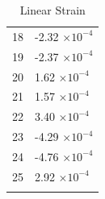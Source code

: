 \documentclass[a4paper,11pt]{article}
\begin{document}
\begin{center}
\begin{longtable}{|R{1.5cm}|R{2.5cm}|}
   18 &        -2.32 $\times 10^{          -4}$ \\
   19 &        -2.37 $\times 10^{          -4}$ \\
   20 &         1.62 $\times 10^{          -4}$ \\
   21 &         1.57 $\times 10^{          -4}$ \\
 {\color{OliveGreen}  22} & {\color{OliveGreen}        3.40 $\times 10^{          -4}$} \\
   23 &        -4.29 $\times 10^{          -4}$ \\
 {\color{red}  24} & {\color{red}       -4.76 $\times 10^{          -4}$} \\
   25 &         2.92 $\times 10^{          -4}$ \\
\bottomrule[0.8mm]                               
\caption{Linear Strain}             
\end{longtable}                                  
\end{center}                                     
\end{document}
